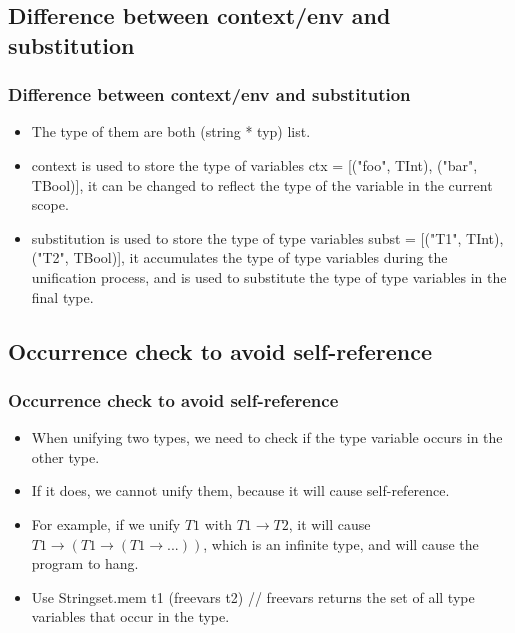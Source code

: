 \documentclass[t]{beamer}
\begin{document}
    \subsection{Difference between context/env and substitution}
    \begin{frame}
        \frametitle{Difference between context/env and substitution}
        \begin{itemize}
            \item The type of them are both {\ttfamily (string * typ) list}.
            \item context is used to store the type of variables {\ttfamily ctx = [("foo", TInt), ("bar", TBool)]}, 
            it can be changed to reflect the type of the variable in the current scope. 
            \item substitution is used to store the type of type variables {\ttfamily subst = [("T1", TInt), ("T2", TBool)]}, 
            it accumulates the type of type variables during the unification process, and is used to substitute the type of type variables in the final type.
        \end{itemize}
    \end{frame}

    \subsection{Occurrence check to avoid self-reference}
    \begin{frame}
        \frametitle{Occurrence check to avoid self-reference}
        \begin{itemize}
            \item When unifying two types, we need to check if the type variable occurs in the other type.
            \item If it does, we cannot unify them, because it will cause self-reference.
            \item For example, if we unify $T1$ with $T1 \rightarrow T2$, it will cause $T1 \rightarrow (T1 \rightarrow (T1 \rightarrow ...))$, 
            which is an infinite type, and will cause the program to hang.
            \item Use {\ttfamily Stringset.mem t1 (freevars t2)} // freevars returns the set of all type variables that occur in the type.
        \end{itemize}
    \end{frame}

\end{document}
